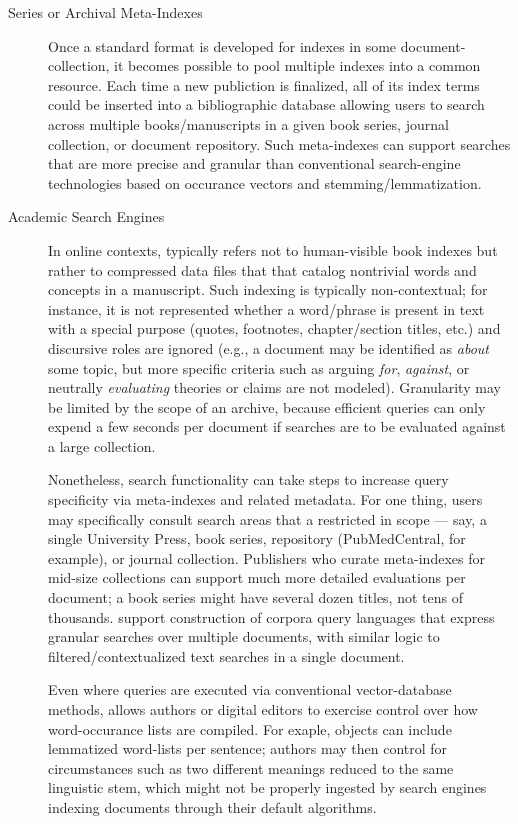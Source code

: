 \documentclass[11pt]{article}
\begin{document}
{{\begin{description}
\item[Series or Archival Meta-Indexes]  Once a standard format 
is developed for indexes in some document-collection, it becomes 
possible to pool multiple indexes into a common resource.  
Each time a new publiction is finalized, all of its index 
terms could be inserted into a bibliographic database 
allowing users to search across multiple books/manuscripts 
in a given book series, journal collection, or document 
repository.  Such meta-indexes can support searches 
that are more precise and granular than conventional 
search-engine technologies based on occurance vectors 
and stemming/lemmatization.

\item[Academic Search Engines]  In online contexts,  typically 
refers not to human-visible book indexes but rather to 
compressed data files that that catalog nontrivial words 
and concepts in a manuscript.  Such indexing is typically 
non-contextual; for instance, it is not represented whether a 
word/phrase is present in text with a special purpose 
(quotes, footnotes, chapter/section titles, etc.) and 
discursive roles are ignored (e.g., a document may be identified as 
\textit{about} some topic, but more specific criteria 
such as arguing \textit{for}, \textit{against}, or neutrally 
\textit{evaluating} theories or claims are not modeled).  
Granularity may be limited by the scope of an archive, because 
efficient queries can only expend a few seconds per 
document if searches are to be evaluated against a large collection.  

\pseudoIndent{} Nonetheless, search functionality can take 
steps to increase query specificity via meta-indexes and 
related metadata.  For one thing, users may specifically 
consult search areas that a restricted in scope --- say, a single 
University Press, book series, repository (PubMedCentral, for example), 
or journal collection.  Publishers who curate meta-indexes 
for mid-size collections can support much more detailed 
evaluations per document; a book series might have several 
dozen titles, not tens of thousands.  \lPacTk{} support 
construction of corpora query languages that express 
granular searches over multiple documents, with 
similar logic to filtered/contextualized text searches 
in a single \PDF{} document.

\pseudoIndent{} Even where queries are executed via conventional 
vector-database methods, \PacTk{} allows authors or digital editors 
to exercise control over how word-occurance lists are compiled.  
For exaple, \TSOM{} objects can include lemmatized word-lists 
per sentence; authors may then control for 
circumstances such as two different meanings reduced to the 
same linguistic stem, which might not be properly 
ingested by search engines indexing documents 
through their default algorithms.


\end{description}}}
\end{document}
